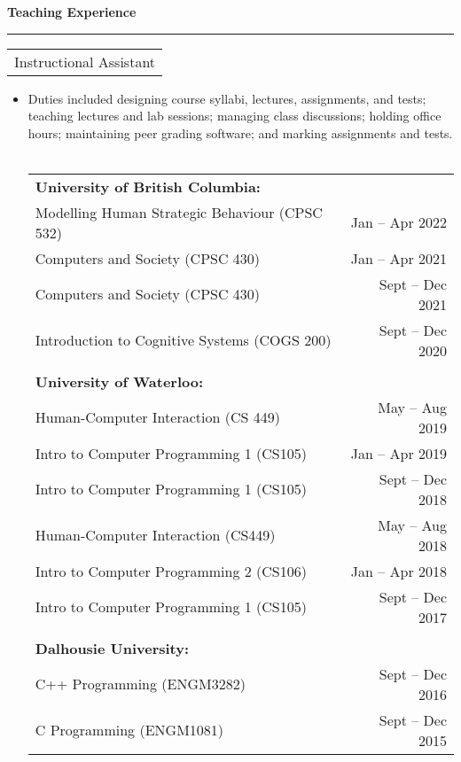 \documentclass{article}
\newcommand{\heading}[1]
{
	\vspace{3pt}
	{\bf #1} 
	\vspace{-6pt}
	
	\rule{\linewidth}{0.4pt}
}
\begin{document}
\heading{Teaching Experience}
\begin{tabularx}{\textwidth}{X}
	Instructional Assistant
\end{tabularx}
\begin{itemize}
	\item Duties included designing course syllabi, lectures, assignments, and tests; teaching lectures and lab sessions; managing class discussions; holding office hours; maintaining peer grading software; and marking assignments and tests. \\~\\
	\begin{tabularx}{\linewidth}{Xr}
		\textbf{University of British Columbia:}	\\
		Modelling Human Strategic Behaviour (CPSC 532) & Jan -- Apr 2022 \\
		Computers and Society (CPSC 430) & Jan -- Apr 2021 \\
		Computers and Society (CPSC 430) & Sept -- Dec 2021 \\
		Introduction to Cognitive Systems (COGS 200) & Sept -- Dec 2020 \\
		\\
		\textbf{University of Waterloo:}	\\
		Human-Computer Interaction (CS 449) & May -- Aug 2019 \\
		Intro to Computer Programming 1 (CS105) & Jan -- Apr 2019 \\
		Intro to Computer Programming 1 (CS105) & Sept -- Dec 2018 \\
		Human-Computer Interaction (CS449) & May -- Aug 2018 \\
		Intro to Computer Programming 2 (CS106) & Jan -- Apr 2018 \\
		Intro to Computer Programming 1 (CS105) & Sept -- Dec 2017 \\
		\\
		\textbf{Dalhousie University:}	\\
		C++ Programming (ENGM3282) & Sept -- Dec 2016 \\ 
		C Programming (ENGM1081) & Sept -- Dec 2015 \\
	\end{tabularx} ~\\
\end{itemize}
\end{document}
